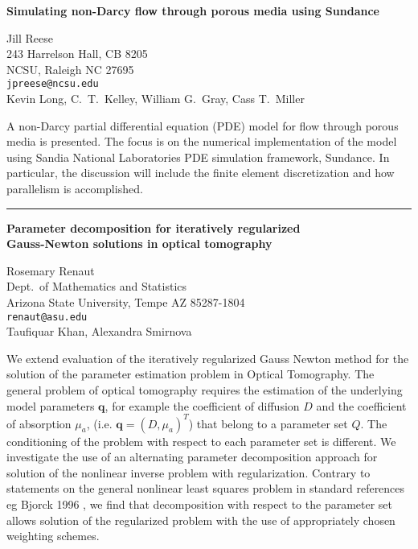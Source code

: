 \documentclass[twosided]{report}
\begin{document}
\begin{center}
{\large			%
{\bf Simulating non-Darcy flow through porous media using Sundance}}

	Jill Reese \\
	243 Harrelson Hall, CB 8205 \\
	NCSU, Raleigh NC 27695 \\
	{\tt jpreese@ncsu.edu} \\
	Kevin Long, C.~T.~Kelley, William G.~Gray, Cass T.~Miller
\end{center}
A non-Darcy partial differential equation (PDE) model for
flow through porous media is presented. The focus is on the
numerical implementation of the model using Sandia National
Laboratories PDE simulation framework, Sundance. In
particular, the discussion will include the finite element
discretization and how parallelism is accomplished.



	\begin{center} \rule{6in}{1pt} \end{center}

\newpage

\begin{center}
{\large			%
{\bf Parameter decomposition for iteratively regularized \\
	Gauss-Newton solutions in optical tomography}}

	Rosemary Renaut \\
	Dept.~of Mathematics and Statistics \\
	Arizona State University,  Tempe AZ 85287-1804 \\
	{\tt renaut@asu.edu} \\
	Taufiquar Khan, Alexandra Smirnova
\end{center}
We extend evaluation of the iteratively regularized Gauss
Newton method for the solution of the parameter estimation
problem in Optical Tomography. The general problem of
optical tomography requires the estimation of the underlying
model parameters ${\mathbf q}$, for example the coefficient
of diffusion $D$ and the coefficient of absorption $\mu_a$,
(i.e. ${\mathbf q}=(D,\mu_a)^T$) that belong to a parameter
set $Q$. The conditioning of the problem with respect to
each parameter set is different. We investigate the use of
an alternating parameter decomposition approach for solution
of the nonlinear inverse problem with regularization.
Contrary to statements on the general nonlinear least
squares problem in standard references eg Bjorck 1996 , we
find that decomposition with respect to the parameter set
allows solution of the regularized problem with the use of
appropriately chosen weighting schemes.
\end{document}
